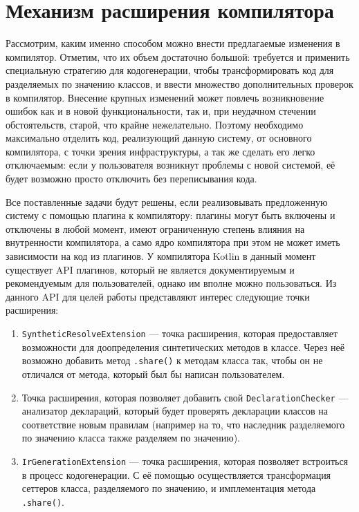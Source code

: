 \documentclass[specification,annotation,times]{itmo-student-thesis}
\begin{document}
\section{Механизм расширения компилятора}\label{codegen}

Рассмотрим, каким именно способом можно внести предлагаемые изменения в компилятор. Отметим, что их объем достаточно большой: требуется и применить специальную стратегию для кодогенерации, чтобы трансформировать код для разделяемых по значению классов, и ввести множество дополнительных проверок в компилятор.
Внесение крупных изменений может повлечь возникновение ошибок как и в новой функциональности, так и, при неудачном стечении обстоятельств, старой, что крайне нежелательно.
Поэтому необходимо максимально отделить код, реализующий данную систему, от основного компилятора, с точки зрения инфраструктуры, а так же сделать его легко отключаемым: если у пользователя возникнут проблемы с новой системой, её будет возможно просто отключить без переписывания кода.

Все поставленные задачи будут решены, если реализовывать предложенную систему с помощью плагина к компилятору: плагины могут быть включены и отключены в любой момент, имеют ограниченную степень влияния на внутренности компилятора, а само ядро компилятора при этом не может иметь зависимости на код из плагинов.
У компилятора Kotlin в данный момент существует API плагинов, который не является документируемым и рекомендуемым для пользователей, однако им вполне можно пользоваться. Из данного API для целей работы представляют интерес следующие точки расширения:

\begin{enumerate}
	\item \texttt{SyntheticResolveExtension} --- точка расширения, которая предоставляет возможности для доопределения синтетических методов в классе. Через неё возможно добавить метод \texttt{.share()} к методам класса так, чтобы он не отличался от метода, который был бы написан пользователем.
	\item Точка расширения, которая позволяет добавить свой \texttt{DeclarationChecker} --- анализатор деклараций, который будет проверять декларации классов на соответствие новым правилам (например на то, что наследник разделяемого по значению класса также разделяем по значению).
	\item \texttt{IrGenerationExtension} --- точка расширения, которая позволяет встроиться в процесс кодогенерации. С её помощью осуществляется трансформация сеттеров класса, разделяемого по значению, и имплементация метода \texttt{.share()}.
\end{enumerate}
\end{document}
